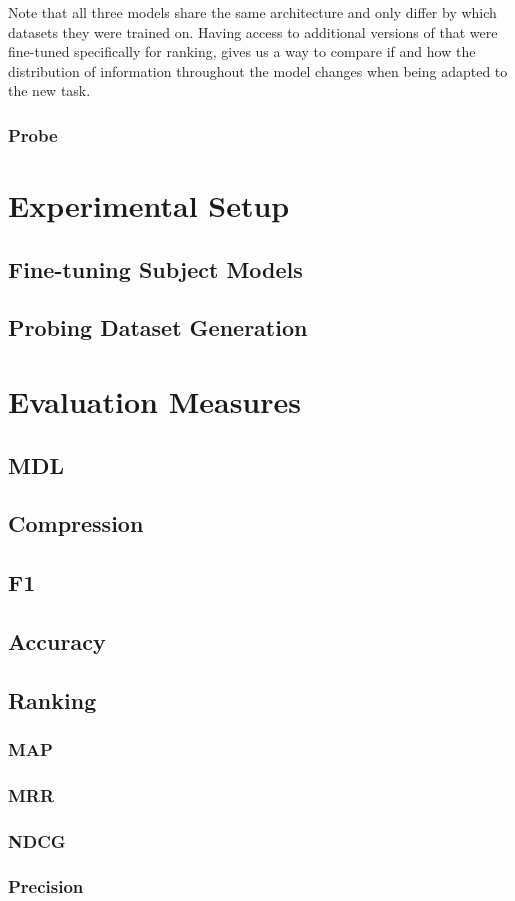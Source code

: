 Note that all three models share the same architecture and only differ by which datasets they were trained on. Having access to additional versions of  that were fine-tuned specifically for ranking, gives us a way to compare if and how the distribution of information throughout the model changes when being adapted to the new task.

\subsubsection{Probe}



\section{Experimental Setup}
\subsection{Fine-tuning Subject Models}
\subsection{Probing Dataset Generation}

\section{Evaluation Measures}
\subsection{MDL}
\subsection{Compression}
\subsection{F1}
\subsection{Accuracy}
\subsection{Ranking}
\subsubsection{MAP}
\subsubsection{MRR}
\subsubsection{NDCG}
\subsubsection{Precision}

